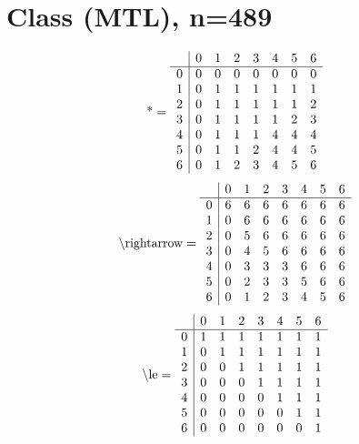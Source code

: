 \documentclass[11pt]{article}
\begin{document}
\section{Class (MTL), n=489}
\[\text{*} = 
\begin{array}{r | r r r r r r r}
 & 0 & 1 & 2 & 3 & 4 & 5 & 6 \\ \hline
0 & 0 & 0 & 0 & 0 & 0 & 0 & 0 \\
1 & 0 & 1 & 1 & 1 & 1 & 1 & 1 \\
2 & 0 & 1 & 1 & 1 & 1 & 1 & 2 \\
3 & 0 & 1 & 1 & 1 & 1 & 2 & 3 \\
4 & 0 & 1 & 1 & 1 & 4 & 4 & 4 \\
5 & 0 & 1 & 1 & 2 & 4 & 4 & 5 \\
6 & 0 & 1 & 2 & 3 & 4 & 5 & 6 \\
\end{array}
\]
\[\text{\textbackslash rightarrow} = 
\begin{array}{r | r r r r r r r}
 & 0 & 1 & 2 & 3 & 4 & 5 & 6 \\ \hline
0 & 6 & 6 & 6 & 6 & 6 & 6 & 6 \\
1 & 0 & 6 & 6 & 6 & 6 & 6 & 6 \\
2 & 0 & 5 & 6 & 6 & 6 & 6 & 6 \\
3 & 0 & 4 & 5 & 6 & 6 & 6 & 6 \\
4 & 0 & 3 & 3 & 3 & 6 & 6 & 6 \\
5 & 0 & 2 & 3 & 3 & 5 & 6 & 6 \\
6 & 0 & 1 & 2 & 3 & 4 & 5 & 6 \\
\end{array}
\]
\[\text{\textbackslash le} = 
\begin{array}{r | r r r r r r r}
 & 0 & 1 & 2 & 3 & 4 & 5 & 6 \\ \hline
0 & 1 & 1 & 1 & 1 & 1 & 1 & 1 \\
1 & 0 & 1 & 1 & 1 & 1 & 1 & 1 \\
2 & 0 & 0 & 1 & 1 & 1 & 1 & 1 \\
3 & 0 & 0 & 0 & 1 & 1 & 1 & 1 \\
4 & 0 & 0 & 0 & 0 & 1 & 1 & 1 \\
5 & 0 & 0 & 0 & 0 & 0 & 1 & 1 \\
6 & 0 & 0 & 0 & 0 & 0 & 0 & 1 \\
\end{array}
\]
\end{document}
